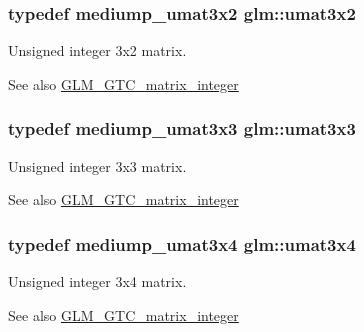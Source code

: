 \subsubsection[{umat3x2}]{\setlength{\rightskip}{0pt plus 5cm}typedef mediump\+\_\+umat3x2 {\bf glm\+::umat3x2}}\label{group__gtc__matrix__integer_ga257300f2710612877ef45438a366e308}
Unsigned integer 3x2 matrix. \begin{DoxySeeAlso}{See also}
\hyperlink{group__gtc__matrix__integer}{G\+L\+M\+\_\+\+G\+T\+C\+\_\+matrix\+\_\+integer} 
\end{DoxySeeAlso}
\hypertarget{group__gtc__matrix__integer_gab80b6501ba1b2c40119a0f2d256f4c97}{}
\subsubsection[{umat3x3}]{\setlength{\rightskip}{0pt plus 5cm}typedef mediump\+\_\+umat3x3 {\bf glm\+::umat3x3}}\label{group__gtc__matrix__integer_gab80b6501ba1b2c40119a0f2d256f4c97}
Unsigned integer 3x3 matrix. \begin{DoxySeeAlso}{See also}
\hyperlink{group__gtc__matrix__integer}{G\+L\+M\+\_\+\+G\+T\+C\+\_\+matrix\+\_\+integer} 
\end{DoxySeeAlso}
\hypertarget{group__gtc__matrix__integer_ga5410857d098a989a30b4017100bc2ff7}{}
\subsubsection[{umat3x4}]{\setlength{\rightskip}{0pt plus 5cm}typedef mediump\+\_\+umat3x4 {\bf glm\+::umat3x4}}\label{group__gtc__matrix__integer_ga5410857d098a989a30b4017100bc2ff7}
Unsigned integer 3x4 matrix. \begin{DoxySeeAlso}{See also}
\hyperlink{group__gtc__matrix__integer}{G\+L\+M\+\_\+\+G\+T\+C\+\_\+matrix\+\_\+integer} 
\end{DoxySeeAlso}
\hypertarget{group__gtc__matrix__integer_ga7ae562000d8a8d193e9f93cf51e2e113}{}
